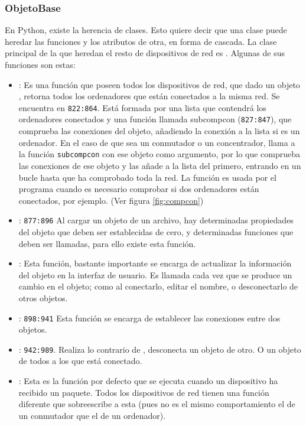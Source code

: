 \documentclass[a4paper, 11pt]{report} %
\begin{document}
\newpage
\subsubsection{ObjetoBase}
En Python, existe la herencia de clases. Esto quiere decir que una clase puede heredar las funciones y los atributos de otra, en forma de cascada. La clase principal de la que heredan el resto de dispositivos de red es . Algunas de sus funciones son estas:

\begin{itemize}
\item {}: Es una función que poseen todos los dispositivos de red, que dado un objeto , retorna todos los ordenadores que están conectados a la misma red. Se encuentra en \texttt{822:864}. Está formada por una lista que contendrá los ordenadores conectados y una función llamada subcompcon (\texttt{827:847}), que comprueba las conexiones del objeto, añadiendo la conexión a la lista si es un ordenador. En el caso de que sea un conmutador o un concentrador, llama a la función \texttt{subcompcon} con ese objeto como argumento, por lo que comprueba las conexiones de ese objeto y las añade a la lista del primero, entrando en un bucle hasta que ha comprobado toda la red. La función es usada por el programa cuando es necesario comprobar si dos ordenadores están conectados, por ejemplo. (Ver figura \ref{fig:compcon})
\item {}: \texttt{877:896} Al cargar un objeto de un archivo, hay determinadas propiedades del objeto que deben ser establecidas de cero, y determinadas funciones que deben ser llamadas, para ello existe esta función.
\item {}: Esta función, bastante importante se encarga de actualizar la información del objeto en la interfaz de usuario. Es llamada cada vez que se produce un cambio en el objeto; como al conectarlo, editar el nombre, o desconectarlo de otros objetos.
\item {}: \texttt{898:941} Esta función se encarga de establecer las conexiones entre dos objetos.
\item {}: \texttt{942:989}. Realiza lo contrario de , desconecta un objeto de otro. O un objeto de todos a los que está conectado.
\item {}: Esta es la función por defecto que se ejecuta cuando un dispositivo ha recibido un paquete. Todos los dispositivos de red tienen una función diferente que sobreescribe a esta (pues no es el mismo comportamiento el de un conmutador que el de un ordenador).
\end{itemize}
\end{document}
